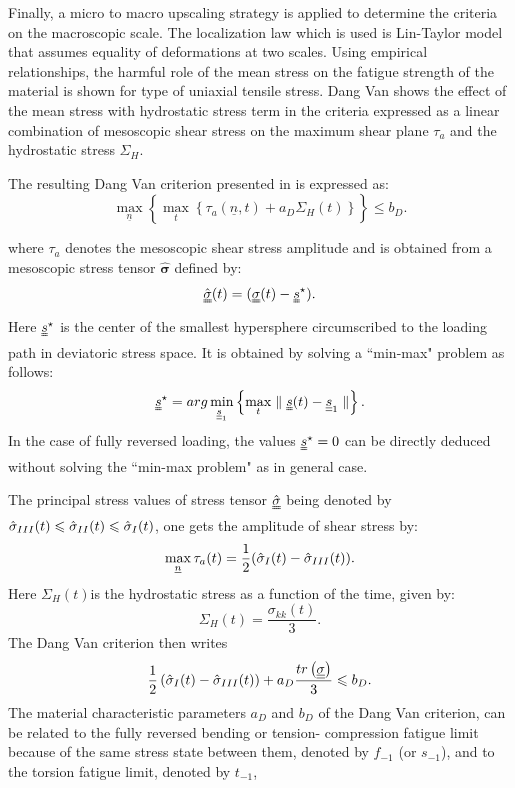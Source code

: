 Finally, a micro to macro upscaling strategy is applied to determine the criteria on the macroscopic scale. The localization law which is used is Lin-Taylor model that assumes equality of deformations at two scales. Using empirical relationships, the harmful role of the mean stress on the fatigue strength of the material is shown for type of uniaxial tensile stress. Dang Van shows the effect of the mean stress with  hydrostatic stress term in the criteria expressed as a linear combination of mesoscopic  shear stress on the maximum shear plane $\tau_a$ and the hydrostatic stress $\Sigma_H$.


The resulting Dang Van criterion presented in \cite{ballard1995high} is expressed as:
\begin{equation}
\max \limits_{\underline{n}}\left\lbrace \max \limits_{t}\left\{\tau_a{(\underline{n},t)}+a_D\Sigma_H(t)\right\}\right\rbrace \leqslant b_D.
\label{dv}
\end{equation}

where $\tau_a$ denotes the mesoscopic shear stress amplitude and is obtained from a mesoscopic stress tensor $\hat{\bm{\sigma}}$ defined by:
$$\hat{\uuline{\sigma}}(t)=(\uuline{\sigma}(t)-\uuline{s}^\star).$$
Here $\uuline{s}^\star$ is the center of the smallest hypersphere circumscribed to the loading path in deviatoric stress space. It is obtained by solving a ``min-max" problem as follows:
$$\uuline{s}^\star = arg \min\limits_{\underline{\underline{s}}_1}\left\{\max\limits_t\parallel \uuline{s}(t)-\underline{\underline{s}}_1\parallel\right\}.$$
In the case of fully reversed loading, the values $\uuline{s}^\star=0$ can be directly deduced without solving the ``min-max problem" as in general case.

The principal stress values of stress tensor $\uuline{\hat{\sigma}}$ being denoted by $\hat{\sigma}_{\Rmnum{3}}(t)\leqslant\hat{\sigma}_{\Rmnum{2}}(t)\leqslant\hat{\sigma}_{\Rmnum{1}}(t)$, one gets the amplitude of shear stress by:
$$\max \limits_{\underline{n}}\tau_a(t)=\frac{1}{2}(\hat{\sigma}_{\Rmnum{1}}(t)-\hat{\sigma}_{\Rmnum{3}}(t)).$$
Here $\Sigma_H(t)$is the hydrostatic stress as a function of the time, given by:$$\Sigma_H(t)=\frac{\sigma_{kk}(t)}{3}.$$
The Dang Van criterion then writes 
\begin{equation}
\frac{1}{2}\left( \hat{\sigma}_{\Rmnum{1}}(t)-\hat{\sigma}_{\Rmnum{3}}(t)\right) +a_D\dfrac{tr\left( \uline{\uline{\sigma}}\right) }{3}\leqslant b_D.
\end{equation}
The material characteristic parameters $a_D$ and $b_D$ of the Dang Van
criterion, can be related to the fully reversed bending or tension-
compression fatigue limit because of the same stress state between them, denoted by $f_{-1}$ (or $s_{-1}$), and to the torsion fatigue limit, denoted by $t_{-1}$,

